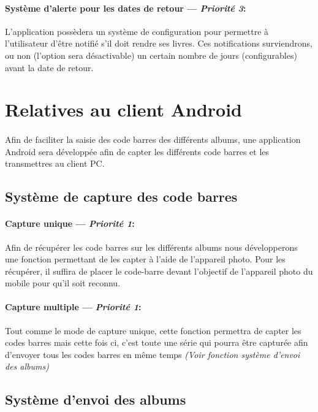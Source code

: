 \paragraph{Système d'alerte pour les dates de retour ---  \textit{Priorité 3}:}  
L'application possèdera un système de configuration pour permettre à l'utilisateur d'être notifié s'il doit rendre ses livres. Ces notifications surviendrons, ou non (l'option sera désactivable) un certain nombre de jours (configurables) avant la date de retour.



\section{Relatives au client Android} 


\paragraph{}
Afin de faciliter la saisie des code barres des différents albums, une application Android sera développée afin de capter les différents code barres et les transmettres au client PC.

\subsection{Système de capture des code barres}
\paragraph{Capture unique ---  \textit{Priorité 1}:}
Afin de récupérer les code barres sur les différents albums nous développerons une fonction permettant de les capter à l'aide de l'appareil photo.
Pour les récupérer, il suffira de placer le code-barre devant l'objectif de l'appareil photo du mobile pour qu'il soit reconnu.

\paragraph{Capture multiple ---  \textit{Priorité 1}:}
Tout comme le mode de capture unique, cette fonction permettra de capter les codes barres mais cette fois ci, c'est toute une série qui pourra être capturée afin d'envoyer tous les codes barres en même temps \textit{(Voir fonction système d'envoi des albums)}

\subsection{Système d'envoi des albums}
